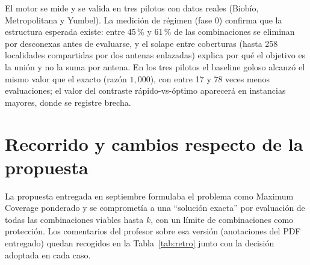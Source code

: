 \documentclass[12pt,letterpaper]{article}
\begin{document}
El motor se mide y se valida en tres pilotos con datos reales (Biobío, Metropolitana y Yumbel). La medición de régimen (fase 0) confirma que la estructura esperada existe: entre 45\,\% y 61\,\% de las combinaciones se eliminan por desconexas antes de evaluarse, y el solape entre coberturas (hasta 258 localidades compartidas por dos antenas enlazadas) explica por qué el objetivo es la unión y no la suma por antena. En los tres pilotos el baseline goloso alcanzó el mismo valor que el exacto (razón $1{,}000$), con entre 17 y 78 veces menos evaluaciones; el valor del contraste rápido-vs-óptimo aparecerá en instancias mayores, donde se registre brecha.

\section{Recorrido y cambios respecto de la propuesta}
La propuesta entregada en septiembre formulaba el problema como Maximum Coverage ponderado y se comprometía a una ``solución exacta'' por evaluación de todas las combinaciones viables hasta $k$, con un límite de combinaciones como protección. Los comentarios del profesor sobre esa versión (anotaciones del PDF entregado) quedan recogidos en la Tabla~\ref{tab:retro} junto con la decisión adoptada en cada caso.
\end{document}
